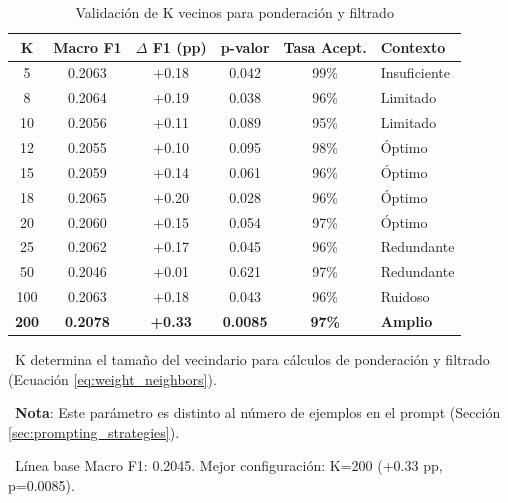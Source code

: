 \begin{table}[htbp]
\centering
\caption{Validación de K vecinos para ponderación y filtrado}
\label{tab:k_neighbors_validation}
\begin{tabular}{cccccl}
\toprule
\textbf{K} & \textbf{Macro F1} & \textbf{$\Delta$ F1 (pp)} & \textbf{p-valor} & \textbf{Tasa Acept.} & \textbf{Contexto} \\
\midrule
5   & 0.2063 & +0.18 & 0.042 & 99\% & Insuficiente \\
8   & 0.2064 & +0.19 & 0.038 & 96\% & Limitado \\
10  & 0.2056 & +0.11 & 0.089 & 95\% & Limitado \\
12  & 0.2055 & +0.10 & 0.095 & 98\% & Óptimo \\
15  & 0.2059 & +0.14 & 0.061 & 96\% & Óptimo \\
18  & 0.2065 & +0.20 & 0.028 & 96\% & Óptimo \\
20  & 0.2060 & +0.15 & 0.054 & 97\% & Óptimo \\
25  & 0.2062 & +0.17 & 0.045 & 96\% & Redundante \\
50  & 0.2046 & +0.01 & 0.621 & 97\% & Redundante \\
100 & 0.2063 & +0.18 & 0.043 & 96\% & Ruidoso \\
\rowcolor{green!20}
\textbf{200} & \textbf{0.2078} & \textbf{+0.33} & \textbf{0.0085} & \textbf{97\%} & \textbf{Amplio} \\
\bottomrule
\end{tabular}
\vspace{0.5em}\footnotesize

\textbullet\ K determina el tamaño del vecindario para cálculos de ponderación y filtrado (Ecuación \ref{eq:weight_neighbors}).

\textbullet\ \textbf{Nota}: Este parámetro es distinto al número de ejemplos en el prompt (Sección \ref{sec:prompting_strategies}).

\textbullet\ Línea base Macro F1: 0.2045. Mejor configuración: K=200 (+0.33 pp, p=0.0085).

\end{table}
